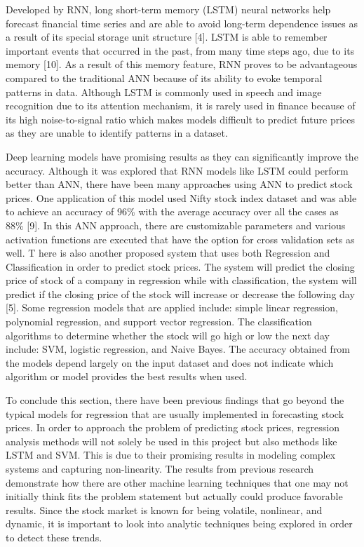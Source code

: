 \documentclass[12pt,a4paper]{article}
\begin{document}
Developed by RNN, long short-term memory (LSTM) neural networks help forecast financial time series and are able to avoid long-term dependence issues as a result of its special storage unit structure [4]. LSTM is able to remember important events that occurred in the past, from many time steps ago, due to its memory [10]. As a result of this memory feature, RNN proves to be advantageous compared to the traditional ANN because of its ability to evoke temporal patterns in data. Although LSTM is commonly used in speech and image recognition due to its attention mechanism, it is rarely used in finance because of its high noise-to-signal ratio which makes models difficult to predict future prices as they are unable to identify patterns in a dataset. 

Deep learning models have promising results as they can significantly improve the accuracy. Although it was explored that RNN models like LSTM could perform better than ANN, there have been many approaches using ANN to predict stock prices. One application of this model used Nifty stock index dataset and was able to achieve an accuracy of 96\% with the average accuracy over all the cases as 88\% [9]. In this ANN approach, there are customizable parameters and various activation functions are executed that have the option for cross validation sets as well. 
T
here is also another proposed system that uses both Regression and Classification in order to predict stock prices. The system will predict the closing price of stock of a company in regression while with classification, the system will predict if the closing price of the stock will increase or decrease the following day [5]. Some regression models that are applied include: simple linear regression, polynomial regression, and support vector regression. The classification algorithms to determine whether the stock will go high or low the next day include: SVM, logistic regression, and Naive Bayes. The accuracy obtained from the models depend largely on the input dataset and does not indicate which algorithm or model provides the best results when used. 

To conclude this section, there have been previous findings that go beyond the typical models for regression that are usually implemented in forecasting stock prices. In order to approach the problem of predicting stock prices, regression analysis methods will not solely be used in this project but also methods like LSTM and SVM. This is due to their promising results in modeling complex systems and capturing non-linearity. The results from previous research demonstrate how there are other machine learning techniques that one may not initially think fits the problem statement but actually could produce favorable results. Since the stock market is known for being volatile, nonlinear, and dynamic, it is important to look into analytic techniques being explored in order to detect these trends.
\end{document}
